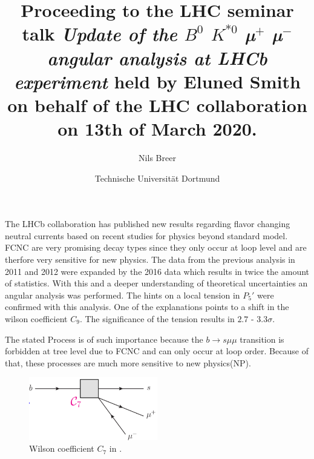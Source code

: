 


\setlength{\oddsidemargin}{0.0 cm}
\setlength{\evensidemargin}{0.0 cm}
\setlength{\topmargin}{-1cm}
\setlength{\textheight}{24 cm}
\setlength{\textwidth}{16 cm}

\pagestyle{plain}

\setlength{\parindent}{0in}



\author{Nils Breer}
\date{Technische Universit\"at Dortmund}

\title{Proceeding to the LHC seminar talk \textit{Update of the $B^0$ \to $K^{*0}$ µ$^{+}$ µ$^{-}$ angular analysis at LHCb experiment} held by Eluned Smith on behalf of the LHC collaboration on 13th of March 2020.}

\maketitle

The LHCb collaboration has published new results regarding flavor changing neutral currents based on recent studies for physics beyond standard model. FCNC are very promising decay types since they only occur at loop level and are therfore very sensitive for new physics.
The data from the previous analysis in 2011 and 2012 were expanded by the 2016 data which results in twice the amount of statistics.
With this and a deeper understanding of theoretical uncertainties an angular analysis was performed. The hints on a local tension in $P_5\prime$ were confirmed with this analysis. One of the explanations points to a shift in the wilson coefficient $C_9$.
The significance of the tension results in $2.7$ - $3.3\sigma$.

The stated Process is of such importance because the
$b \to s \mu \mu$ transition is forbidden at tree level due to FCNC and can only occur at loop order.
Because of that, these processes are much more sensitive to new physics(NP).

\begin{figure}[htb]
  \centering
  \includegraphics[width=0.5\textwidth]{flavor_plots/wilson_c7.png}
  \caption{Wilson coefficient $C_7$ in .}
  \label{fig:sm_process}
\end{figure}

